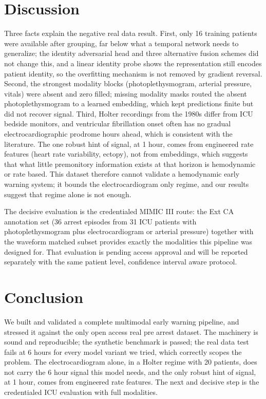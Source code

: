 \documentclass[11pt]{article}
\begin{document}
\section{Discussion}
Three facts explain the negative real data result. First, only 16 training
patients were available after grouping, far below what a temporal network needs to
generalize; the identity adversarial head and three alternative fusion schemes did
not change this, and a linear identity probe shows the representation still
encodes patient identity, so the overfitting mechanism is not removed by
gradient reversal. Second, the strongest modality blocks (photoplethysmogram,
arterial pressure, vitals) were absent and zero filled; missing modality masks
routed the absent photoplethysmogram to a learned embedding, which kept
predictions finite but did not recover signal. Third, Holter recordings from the
1980s differ from ICU bedside monitors, and ventricular fibrillation onset often
has no gradual electrocardiographic prodrome hours ahead, which is consistent with
the literature. The one robust hint of signal, at 1 hour, comes from engineered
rate features (heart rate variability, ectopy), not from embeddings, which
suggests that what little premonitory information exists at that horizon is
hemodynamic or rate based. This dataset therefore cannot validate a hemodynamic
early warning system; it bounds the electrocardiogram only regime, and our
results suggest that regime alone is not enough.

The decisive evaluation is the credentialed MIMIC III route: the Ext CA annotation
set (36 arrest episodes from 31 ICU patients with photoplethysmogram plus
electrocardiogram or arterial pressure) together with the waveform matched subset
provides exactly the modalities this pipeline was designed for. That evaluation is
pending access approval and will be reported separately with the same patient
level, confidence interval aware protocol.

\section{Conclusion}
We built and validated a complete multimodal early warning pipeline, and stressed
it against the only open access real pre arrest dataset. The machinery is sound
and reproducible; the synthetic benchmark is passed; the real data test fails at
6 hours for every model variant we tried, which correctly scopes the problem.
The electrocardiogram alone, in a Holter regime with 20 patients, does not carry
the 6 hour signal this model needs, and the only robust hint of signal, at 1 hour,
comes from engineered rate features. The next and decisive step is the
credentialed ICU evaluation with full modalities.
\end{document}
